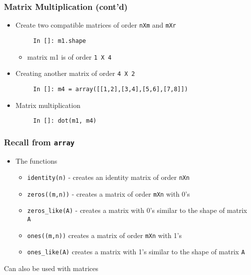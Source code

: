 \documentclass[presentation]{beamer}
\begin{document}
\begin{frame}[fragile]
\frametitle{Matrix Multiplication (cont'd)}
\label{sec-7}

\begin{itemize}
\item Create two compatible matrices of order \texttt{nXm} and \texttt{mXr}
\begin{verbatim}
     In []: m1.shape
\end{verbatim}


\begin{itemize}
\item matrix m1 is of order \texttt{1 X 4}
\end{itemize}

\item Creating another matrix of order \texttt{4 X 2}
\begin{verbatim}
     In []: m4 = array([[1,2],[3,4],[5,6],[7,8]])
\end{verbatim}

\item Matrix multiplication
\begin{verbatim}
     In []: dot(m1, m4)
\end{verbatim}

\end{itemize}
\end{frame}
\begin{frame}
\frametitle{Recall from \texttt{array}}
\label{sec-8}

\begin{itemize}
\item The functions

\begin{itemize}
\item \texttt{identity(n)} - 
      creates an identity matrix of order \texttt{nXn}
\item \texttt{zeros((m,n))} - 
      creates a matrix of order \texttt{mXn} with 0's
\item \texttt{zeros\_like(A)} - 
      creates a matrix with 0's similar to the shape of matrix \texttt{A}
\item \texttt{ones((m,n))}
      creates a matrix of order \texttt{mXn} with 1's
\item \texttt{ones\_like(A)}
      creates a matrix with 1's similar to the shape of matrix \texttt{A}
\end{itemize}

\end{itemize}

  Can also be used with matrices
\end{frame}
\end{document}
